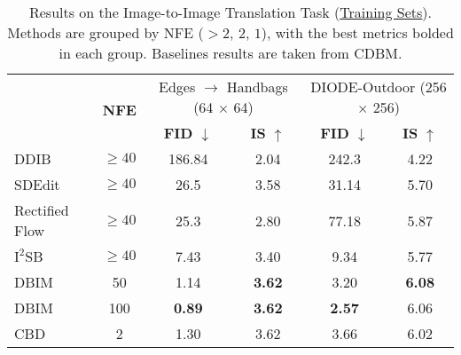 
\begin{table*}[t]
\centering
\caption{Results on the Image-to-Image Translation Task (\underline{Training Sets}). Methods are grouped by NFE ($> 2$, $2$, $1$), with the best metrics bolded in each group. Baselines results are taken from CDBM.}
\label{tab:ddbm train results}
\begin{tabular}{lccc|cc}
\hline
 & \multirow{2}{*}{\textbf{NFE}} & \multicolumn{2}{c|}{Edges $\rightarrow$ Handbags (64 $\times$ 64)} & \multicolumn{2}{c}{DIODE-Outdoor (256 $\times$ 256)} \\ \cline{3-6} 
                &   & \textbf{FID} $\downarrow$ & \textbf{IS} $\uparrow$ & \textbf{FID} $\downarrow$ & \textbf{IS} $\uparrow$ \\ \hline
DDIB \cite{su2022dual}   & $\geq 40$ & 186.84           & 2.04          & 242.3            & 4.22          \\
SDEdit \cite{meng2021sdedit} & $\geq 40$ & 26.5             & 3.58          & 31.14            & 5.70          \\
Rectified Flow \cite{liu2022flow} & $\geq 40$ & 25.3       & 2.80          & 77.18            & 5.87          \\
$\text{I}^2$SB \cite{liu20232} & $\geq 40$ & 7.43             & 3.40          & 9.34             & 5.77          \\
DBIM \cite{zheng2024diffusion} & 50 & 1.14         & \textbf{3.62} & 3.20             &  \textbf{6.08} \\
DBIM \cite{zheng2024diffusion} & 100 & \textbf{0.89}        & \textbf{3.62} &  \textbf{2.57}   & 6.06           \\ \hline
CBD \cite{he2024consistency} & \multirow{3}{*}{2}  & 1.30           & 3.62          & 3.66             & 6.02           \\

\end{tabular}
\end{table*}

